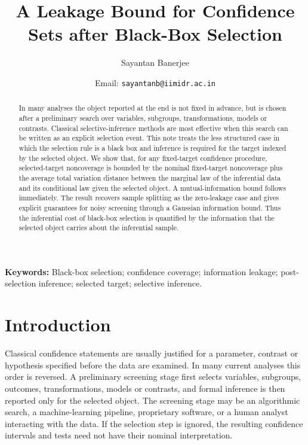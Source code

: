 \documentclass[11pt]{article}
\title{A Leakage Bound for Confidence Sets after Black-Box Selection}
\author{Sayantan Banerjee \orcidlink{0000-0001-5414-4817}}
\affil{OM \& QT Area\\Indian Institute of Management Indore
}
\date{Email: \texttt{sayantanb@iimidr.ac.in}}
\begin{document}
	
	\maketitle
	
	\begin{abstract}
		In many analyses the object reported at the end is not fixed in advance, but is chosen after a preliminary search over variables, subgroups, transformations, models or contrasts. Classical selective-inference methods are most effective when this search can be written as an explicit selection event. This note treats the less structured case in which the selection rule is a black box and inference is required for the target indexed by the selected object. We show that, for any fixed-target confidence procedure, selected-target noncoverage is bounded by the nominal fixed-target noncoverage plus the average total variation distance between the marginal law of the inferential data and its conditional law given the selected object. A mutual-information bound follows immediately. The result recovers sample splitting as the zero-leakage case and gives explicit guarantees for noisy screening through a Gaussian information bound. Thus the inferential cost of black-box selection is quantified by the information that the selected object carries about the inferential sample.
	\end{abstract}
	
	\noindent
	{\bf Keywords:}
	Black-box selection; confidence coverage; information leakage; post-selection inference; selected target; selective inference.
	
\section{Introduction}

Classical confidence statements are usually justified for a parameter, contrast or hypothesis specified before the data are examined. In many current analyses this order is reversed. A preliminary screening stage first selects variables, subgroups, outcomes, transformations, models or contrasts, and formal inference is then reported only for the selected object. The screening stage may be an algorithmic search, a machine-learning pipeline, proprietary software, or a human analyst interacting with the data. If the selection step is ignored, the resulting confidence intervals and tests need not have their nominal interpretation.
\end{document}
